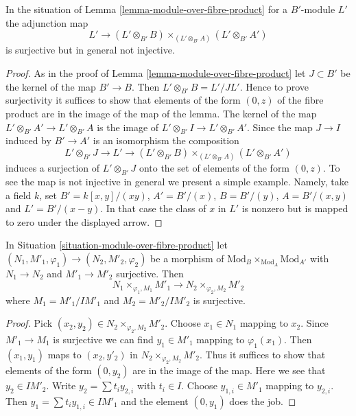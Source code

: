 \begin{lemma}
\label{lemma-module-over-fibre-product-bis}
In the situation of Lemma \ref{lemma-module-over-fibre-product}
for a $B'$-module $L'$ the adjunction map
$$
L' \longrightarrow 
(L' \otimes_{B'} B) \times_{(L' \otimes_{B'} A)} (L' \otimes_{B'} A')
$$
is surjective but in general not injective.
\end{lemma}

\begin{proof}
As in the proof of Lemma \ref{lemma-module-over-fibre-product}
let $J \subset B'$ be the kernel of the map $B' \to B$.
Then $L' \otimes_{B'} B = L'/JL'$. Hence to prove surjectivity it suffices
to show that elements of the form $(0, z)$ of the fibre product are in the
image of the map of the lemma. The kernel of the map
$L' \otimes_{B'} A' \to L' \otimes_{B'} A$ is the image of
$L' \otimes_{B'} I \to L' \otimes_{B'} A'$. Since the map $J \to I$
induced by $B' \to A'$ is an isomorphism
the composition
$$
L' \otimes_{B'} J \to L' \to
(L' \otimes_{B'} B) \times_{(L' \otimes_{B'} A)} (L' \otimes_{B'} A')
$$
induces a surjection of $L' \otimes_{B'} J$ onto the set of elements
of the form $(0, z)$. To see the map is not injective in general we
present a simple example. Namely, take a field $k$,
set $B' = k[x, y]/(xy)$, $A' = B'/(x)$, $B = B'/(y)$, $A = B'/(x, y)$
and $L' = B'/(x - y)$. In that case the class of $x$ in $L'$ is nonzero
but is mapped to zero under the displayed arrow.
\end{proof}

\begin{lemma}
\label{lemma-surjection-module-over-fibre-product}
In Situation \ref{situation-module-over-fibre-product}
let $(N_1, M'_1, \varphi_1) \to (N_2, M'_2, \varphi_2)$ be a morphism
of $\text{Mod}_B \times_{\text{Mod}_A} \text{Mod}_{A'}$
with $N_1 \to N_2$ and $M'_1 \to M'_2$ surjective. Then
$$
N_1 \times_{\varphi_1, M_1} M'_1 \to N_2 \times_{\varphi_2, M_2} M'_2
$$
where $M_1 = M'_1/IM'_1$ and $M_2 = M'_2/IM'_2$ is surjective.
\end{lemma}

\begin{proof}
Pick $(x_2, y_2) \in N_2 \times_{\varphi_2, M_2} M'_2$. Choose $x_1 \in N_1$
mapping to $x_2$. Since $M'_1 \to M_1$ is surjective we can find
$y_1 \in M'_1$ mapping to $\varphi_1(x_1)$. Then $(x_1, y_1)$
maps to $(x_2, y'_2)$ in $N_2 \times_{\varphi_2, M_2} M'_2$. Thus it suffices
to show that elements of the form $(0, y_2)$ are in the image of the map.
Here we see that $y_2 \in IM'_2$. Write $y_2 = \sum t_i y_{2, i}$
with $t_i \in I$. Choose $y_{1, i} \in M'_1$ mapping to $y_{2, i}$.
Then $y_1 = \sum t_iy_{1, i} \in IM'_1$ and the element $(0, y_1)$
does the job.
\end{proof}

